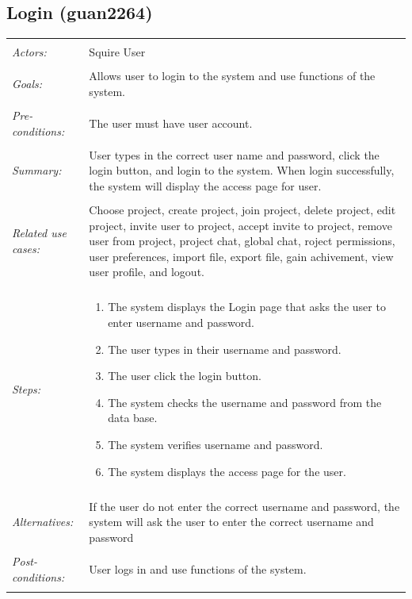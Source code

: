 \documentclass[11pt]{report}
\begin{document}
\begin{IDE-like Features}
\begin{}
\begin{Collaborative features that would be "nice":}
\subsection{Login (guan2264)}
\begin{tabular}{ p{2cm} p{12cm} }
 \hline
 \\
 \textit{Actors:} & Squire User \\ 
 \\
 \textit{Goals:} & Allows user to login to the system and use functions of the system. \\
 \\
 \textit{Pre-conditions:} & The user must have user account. \\
 \\
 \textit{Summary:} & User types in the correct user name and password, click the login button, and login to the system. When login successfully, the system will display the access page for user. \\ 
 \\
 \textit{Related use cases:} & Choose project, create project, join project, delete project, edit project, invite user to project, accept invite to project, remove user from project, project chat, global chat, roject permissions, user preferences, import file, export file, gain achivement, view user profile, and logout. \\ 
 \\
 \textit{Steps:} & \begin{enumerate}
  \item The system displays the Login page that asks the user to enter username and password.
  \item The user types in their username and password.
  \item The user click the login button.
  \item The system checks the username and password from the data base.
  \item The system verifies username and password.
  \item	The system displays the access page for the user.
 \end{enumerate} \\
 \\
 \textit{Alternatives:} & If the user do not enter the correct username and password, the system will ask the user to enter the correct username and password \\
 \\
 \textit{Post-conditions:} & User logs in and use functions of the system. \\
 \\
\hline
\end{tabular}


\end{Collaborative features that would be "nice":}
\end{}
\end{IDE-like Features}
\end{document}
